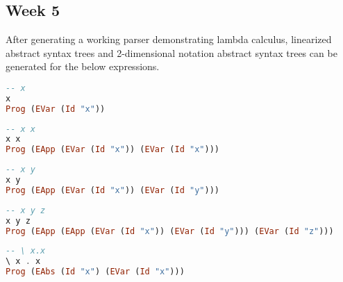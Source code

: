 \documentclass{article}
\theoremstyle{theorem}
\theoremstyle{definition}
\theoremstyle{remark}
\begin{document}
\hfil
{}
\hfil
\subsection{Week 5}
After generating a working parser demonstrating lambda calculus, linearized abstract syntax trees and 2-dimensional notation abstract syntax trees can be generated for the below expressions.
\begin{lstlisting}[language=Haskell]
-- x
x 
Prog (EVar (Id "x"))
\end{lstlisting}

\hfil
{}
\hfil

\newpage
\begin{lstlisting}[language=Haskell]
-- x x
x x
Prog (EApp (EVar (Id "x")) (EVar (Id "x")))
\end{lstlisting}

\hfil
{}
\hfil

\begin{lstlisting}[language=Haskell]
-- x y
x y
Prog (EApp (EVar (Id "x")) (EVar (Id "y")))
\end{lstlisting}

\hfil
{}
\hfil

\begin{lstlisting}[language=Haskell]
-- x y z
x y z
Prog (EApp (EApp (EVar (Id "x")) (EVar (Id "y"))) (EVar (Id "z")))
\end{lstlisting}

\hfil
{}
\hfil

\begin{lstlisting}[language=Haskell]
-- \ x.x
\ x . x
Prog (EAbs (Id "x") (EVar (Id "x")))
\end{lstlisting}
\end{document}
